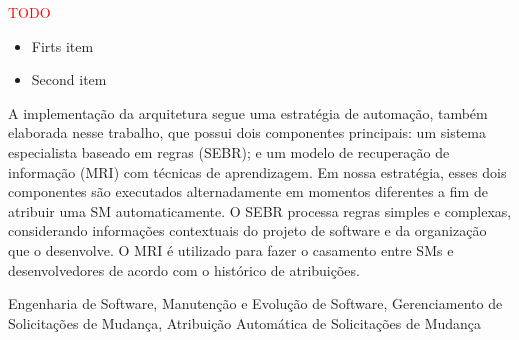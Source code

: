 
\textcolor{red}{TODO}
\begin{itemize}
\color{red}
\item Firts item
\item Second item
\end{itemize}

A implementação da arquitetura segue uma estratégia de automação, também
elabo\-rada nesse trabalho, que possui dois componentes principais: um sistema
especialista baseado em regras (SEBR); e um modelo de recuperação de informação
(MRI) com técnicas de aprendizagem. Em nossa estratégia, esses dois componentes
são executados alternadamente em momentos diferentes a fim de atribuir uma SM
automaticamente. O SEBR processa regras simples e complexas, considerando
informações contextuais do projeto de software e da organização que o
desenvolve. O MRI é utilizado para fazer o casamento entre SMs e desenvolvedores
de acordo com o histórico de atribuições.

\begin{keywords}
Engenharia de Software, Manutenção e Evolução de Software, Gerenciamento de
Solicitações de Mudança, Atribuição Automática de Solicitações de Mudança
\end{keywords}